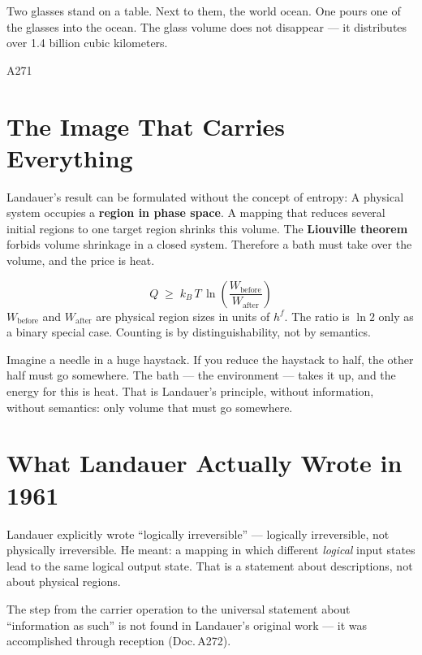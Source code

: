 \label{ch:landauer}

\epigraph{Two glasses stand on a table. Next to them, the world ocean.
One pours one of the glasses into the ocean. The glass volume does not disappear ---
it distributes over 1.4 billion cubic kilometers.}{A271}

\section{The Image That Carries Everything}

Landauer's result can be formulated without the concept of entropy: A
physical system occupies a \textbf{region in phase space}.
A mapping that reduces several initial regions to one target region
shrinks this volume. The \textbf{Liouville theorem} forbids
volume shrinkage in a closed system. Therefore a bath must take over the
volume, and the price is heat. 

\begin{landbox}
\[
  Q \;\ge\; k_B\,T\,\ln\!\left(\frac{W_{\text{before}}}{W_{\text{after}}}\right)
\]
$W_{\text{before}}$ and $W_{\text{after}}$ are physical
region sizes in units of $h^f$. The ratio is $\ln 2$ only
as a binary special case. Counting is by distinguishability, not by
semantics. 
\end{landbox}

\begin{laierspur}
Imagine a needle in a huge haystack.
If you reduce the haystack to half, the other half must go
somewhere. The bath --- the environment --- takes it up, and the energy
for this is heat. That is Landauer's principle, without information, without semantics:
only volume that must go somewhere.
\end{laierspur}

\section{What Landauer Actually Wrote in 1961}

Landauer explicitly wrote \enquote{logically irreversible} --- logically
irreversible, not physically irreversible. He meant: a mapping
in which different \emph{logical} input states lead to the same
logical output state. That is a statement about descriptions,
not about physical regions. 

The step from the carrier operation to the universal statement about
\enquote{information as such} is not found in Landauer's original work
--- it was accomplished through reception (Doc.\,A272).

